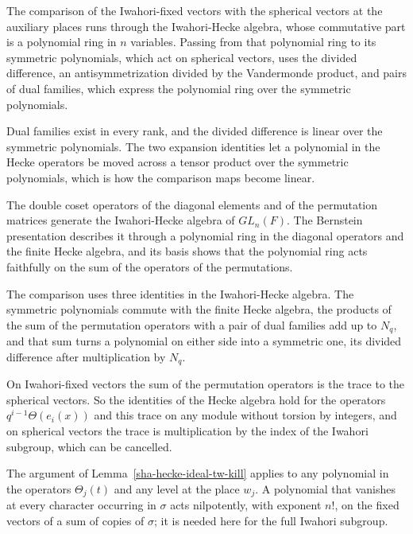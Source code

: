 The comparison of the Iwahori-fixed vectors with the spherical vectors at the auxiliary places runs through the Iwahori-Hecke algebra, whose commutative part is a polynomial ring in $n$ variables. Passing from that polynomial ring to its symmetric polynomials, which act on spherical vectors, uses the divided difference, an antisymmetrization divided by the Vandermonde product, and pairs of dual families, which express the polynomial ring over the symmetric polynomials.

Dual families exist in every rank, and the divided difference is linear over the symmetric polynomials. The two expansion identities let a polynomial in the Hecke operators be moved across a tensor product over the symmetric polynomials, which is how the comparison maps become linear.

The double coset operators of the diagonal elements and of the permutation matrices generate the Iwahori-Hecke algebra of $GL_n(F)$. The Bernstein presentation describes it through a polynomial ring in the diagonal operators and the finite Hecke algebra, and its basis shows that the polynomial ring acts faithfully on the sum of the operators of the permutations.

The comparison uses three identities in the Iwahori-Hecke algebra. The symmetric polynomials commute with the finite Hecke algebra, the products of the sum of the permutation operators with a pair of dual families add up to $N_q$, and that sum turns a polynomial on either side into a symmetric one, its divided difference after multiplication by $N_q$.

On Iwahori-fixed vectors the sum of the permutation operators is the trace to the spherical vectors. So the identities of the Hecke algebra hold for the operators $q^{i-1}\Theta(e_i(x))$ and this trace on any module without torsion by integers, and on spherical vectors the trace is multiplication by the index of the Iwahori subgroup, which can be cancelled.

The argument of Lemma~\ref{sha-hecke-ideal-tw-kill} applies to any polynomial in the operators $\Theta_j(t)$ and any level at the place $w_j$. A polynomial that vanishes at every character occurring in $\sigma$ acts nilpotently, with exponent $n!$, on the fixed vectors of a sum of copies of $\sigma$; it is needed here for the full Iwahori subgroup.

